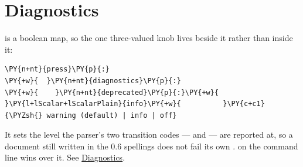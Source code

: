 \documentclass[a4paper,twoside]{article}
\begin{document}
\section{Diagnostics}
 is a boolean map, so the one three-valued knob lives beside it
rather than inside it:
\begin{tscode}[lang=yaml, engine=pygments]
\begin{Verbatim}[commandchars=\\\{\},breaklines, breakanywhere, commandchars=\\\{\}]
\PY{n+nt}{press}\PY{p}{:}
\PY{+w}{  }\PY{n+nt}{diagnostics}\PY{p}{:}
\PY{+w}{    }\PY{n+nt}{deprecated}\PY{p}{:}\PY{+w}{ }\PY{l+lScalar+lScalarPlain}{info}\PY{+w}{          }\PY{c+c1}{\PYZsh{} warning (default) | info | off}
\end{Verbatim}
\end{tscode}
It sets the level the parser's two transition codes ---  and
 --- are reported at, so a document still written in
the 0.6 spellings does not fail its own .  on the
command line wins over it. See \href{diagnostics.md\#-deprecated}{Diagnostics}.
\end{document}
